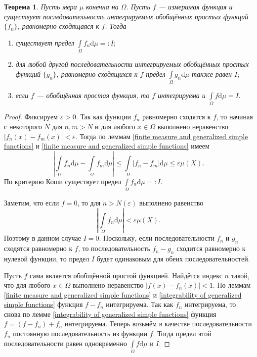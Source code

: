 \documentclass[12pt]{article}
\newtheorem{theorem}{Теорема}
\numberwithin{theorem}{section}
\theoremstyle{definition}
\newcommand{\diff}{\mathrm{d}}
\begin{document}
	\begin{theorem} \label{integrability}
		Пусть мера $ \mu $ конечна на $ \Omega $.
		Пусть $ f $ --- измеримая функция и существует последовательность интегрируемых обобщённых простых функций $ \{f_n\} $,
		равномерно сходящаяся к $ f $. Тогда
		\begin{enumerate}
			\item существует предел $ \int\limits_{\Omega} f_n \diff\mu =: I; $
			\item для любой другой последовательности интегрируемых обобщённых простых функций $ \{g_n\} $,
			равномерно сходящихся к $ f $ предел $ \int\limits_{\Omega} g_n \diff\mu $ также равен $ I; $
			\item если $ f $ --- обобщённая простая функция, то $ f $ интегрируема и $ \int\limits_{\Omega} f\diff\mu = I. $
		\end{enumerate}
	\end{theorem}
	
	\begin{proof}
		Фиксируем $ \varepsilon > 0 $.
		Так как функции $ f_n $ равномерно сходятся к $ f $, то начиная с некоторого $ N $
		для $ n, m > N $ и для любого $ x \in \Omega $ выполнено неравенство $ |f_n(x) - f_m(x)| < \varepsilon $.
		Тогда по леммам \ref{finite measure and generalized simple functions} и \ref{finite measure and generalized simple functions} имеем
		$$ \left|\int\limits_{\Omega} f_n\diff\mu - \int\limits_{\Omega} f_m\diff\mu\right| \leqslant \int\limits_{\Omega} |f_n - f_m|\diff\mu \leqslant \varepsilon \mu(X). $$
		По критерию Коши существует предел $ \int\limits_{\Omega} f_n \diff\mu =: I. $
		
		Заметим, что если $ f = 0 $, то для $ n > N(\varepsilon) $ выполнено равенство
		$$ \left|\int\limits_{\Omega} f_n\diff\mu\right| < \varepsilon\mu(X). $$
		Поэтому в данном случае $ I = 0 $. Поскольку, если последовательности $ f_n $ и $ g_n $ сходятся равномерно
		к $ f $, то последовательность $ f_n - g_n $ сходится равномерно к нулевой функции,
		то предел $ I $ будет одинаковым для обеих последовательностей.
		
		Пусть $ f $ сама является обобщённой простой функцией.
		Найдётся индекс $ n $ такой, что для любого $ x \in \Omega $
		выполнено неравенство $ |f(x) - f_n(x)| < 1 $.
		По леммам \ref{finite measure and generalized simple functions}
		и \ref{integrability of generalized simple functions}
		функция $ f - f_n $ интегрируема.
		Так как $ f_n $ интегрируема, то снова по лемме \ref{integrability of generalized simple functions} функция $ f = (f - f_n) + f_n $ интегрируема.
		Теперь возьмём в качестве последовательности $ f_n $ постоянную последовательность из функции $ f $.
		Тогда предел этой последовательности равен одновременно $ \int\limits_{\Omega} f\diff\mu $ и $ I $.
	\end{proof}
	
\end{document}
